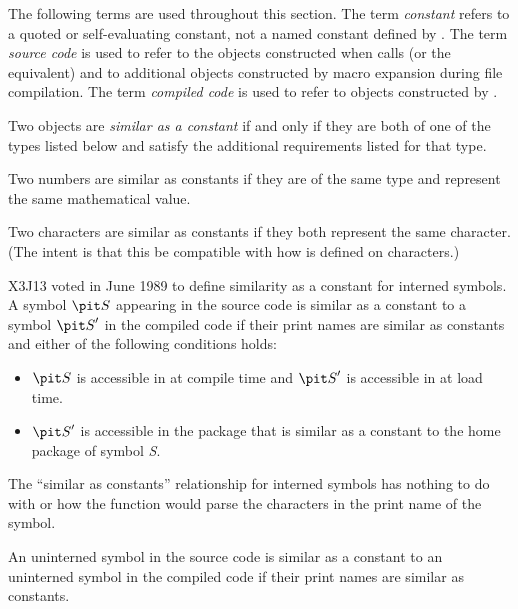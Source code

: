 \begin{newer}
The following terms are used throughout this section.
  The term {\it constant} refers to a quoted or self-evaluating constant,
  not a named constant defined by .
  The term {\it source code} is used to refer to the objects constructed
  when  calls  (or the equivalent) and to
  additional objects constructed by
  macro expansion during file compilation.
  The term {\it compiled code} is used to refer to objects constructed by 
  .

Two objects are {\it similar as a constant} if and only if
they are both of one of the types listed below and satisfy the
additional requirements listed for that type.

\begin{flushdesc}
\item[\cd{number}]

  Two numbers are similar as constants if they are of the same type
  and represent the same mathematical value.
  
\item[\cd{character}]

  Two characters are similar as constants if they both represent
  the same character.  (The intent is that this be compatible with
  how  is defined on characters.)

\item[\cd{symbol}]
  X3J13 voted in June 1989 
  to define similarity as a constant for interned symbols.
  A symbol ${\it S}$ appearing in the source code is similar as a constant to 
  a symbol ${\it S}'$ in the compiled code if their print names are similar as constants
   and either of the following conditions holds:
\begin{itemize}
\item  ${\it S}$ is accessible in  at compile time and ${\it S}'$ is accessible in
        at load time.
\item  ${\it S}'$ is accessible in the package that is similar as a constant to the
       home package of symbol {\it S}.
\end{itemize}
  The ``similar as constants'' relationship for interned symbols has nothing
  to do with  or how the function  would parse the 
  characters in the print name of the symbol.

  An uninterned symbol in the source code is similar as a constant
  to an uninterned symbol in the compiled code if their print names
  are similar as constants.


\end{flushdesc}
\end{newer}
